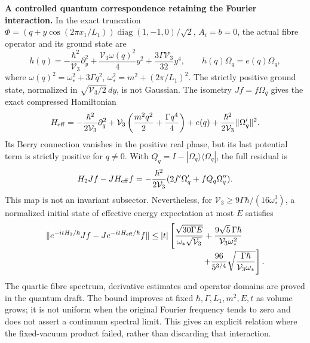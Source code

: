 \documentclass[10pt,letterpaper]{article}
\begin{document}
\noindent\textbf{A controlled quantum correspondence retaining the Fourier interaction.}
In the exact truncation $\Phi=(q+y\cos(2\pi x_1/L_1))
\operatorname{diag}(1,-1,0)/\sqrt2$, $A_i=b=0$, the actual fibre
operator and its ground state are
\[
 h(q)=-\frac{\hbar^2}{\mathcal V_3}\partial_y^2
       +\frac{\mathcal V_3\omega(q)^2}{4}y^2
       +\frac{3\Gamma\mathcal V_3}{32}y^4,
 \qquad h(q)\Omega_q=e(q)\Omega_q,
\]
where $\omega(q)^2=\omega_*^2+3\Gamma q^2$,
$\omega_*^2=m^2+(2\pi/L_1)^2$. The strictly positive ground state,
normalized in $\sqrt{\mathcal V_3/2}\,dy$, is not Gaussian.
The isometry $Jf=f\Omega_q$ gives the exact compressed Hamiltonian
\[
 H_{\rm eff}=-\frac{\hbar^2}{2\mathcal V_3}\partial_q^2
 +\mathcal V_3\left(\frac{m^2q^2}{2}+\frac{\Gamma q^4}{4}\right)
 +e(q)+\frac{\hbar^2}{2\mathcal V_3}\|\Omega'_q\|^2.
\]
Its Berry connection vanishes in the positive real phase, but its last
potential term is strictly positive for $q\ne0$. With
$Q_q=I-|\Omega_q\rangle\langle\Omega_q|$, the full residual is
\[
 H_2Jf-JH_{\rm eff}f
 =-\frac{\hbar^2}{2\mathcal V_3}
       (2f'\Omega'_q+fQ_q\Omega''_q).
\]
This map is not an invariant subsector. Nevertheless, for
$\mathcal V_3\geq9\Gamma\hbar/(16\omega_*^3)$, a normalized
initial state of effective energy expectation at most $E$ satisfies
\begin{align*}
 \|e^{-itH_2/\hbar}Jf-Je^{-itH_{\rm eff}/\hbar}f\|
 &\leq |t|\left[
 \frac{\sqrt{30\Gamma E}}{\omega_*\sqrt{\mathcal V_3}}
 +\frac{9\sqrt5\,\Gamma\hbar}{\mathcal V_3\omega_*^2}\right.\\[-1mm]
 &\hspace{22mm}\left.
 +\frac{96}{5^{3/4}}
      \sqrt{\frac{\Gamma\hbar}{\mathcal V_3\omega_*}}\right].
\end{align*}
The quartic fibre spectrum, derivative estimates and operator domains
are proved in the quantum draft. The bound improves at fixed
$\hbar,\Gamma,L_1,m^2,E,t$ as volume grows; it is not uniform when
the original Fourier frequency tends to zero and does not assert a
continuum spectral limit. This gives an explicit relation where the
fixed-vacuum product failed, rather than discarding that interaction.
\end{document}
